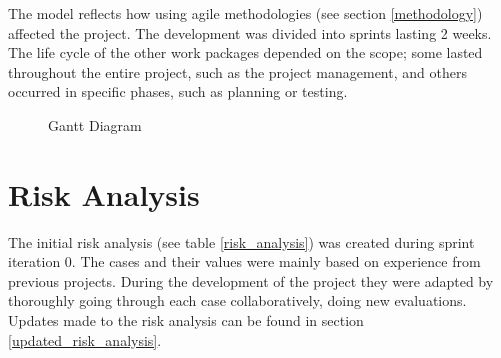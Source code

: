 The model reflects how using agile methodologies (see section \ref{methodology}) affected the project. The development was divided into sprints lasting 2 weeks. The life cycle of the other work packages depended on the scope; some lasted throughout the entire project, such as the project management, and others occurred in specific phases, such as planning or testing. 


\begin{center}
  \begin{figure}[!h]
    \caption{Gantt Diagram}
    \label{Gantt_Diagram}  
  \end{figure}
\end{center}



\section{Risk Analysis} 
\label{riskAnalysis}
The initial risk analysis (see table \ref{risk_analysis}) was created during sprint iteration 0. The cases and their values were mainly based on experience from previous projects. During the development of the project they were adapted by thoroughly going through each case collaboratively, doing new evaluations. Updates made to the risk analysis can be found in section \ref{updated_risk_analysis}. 

